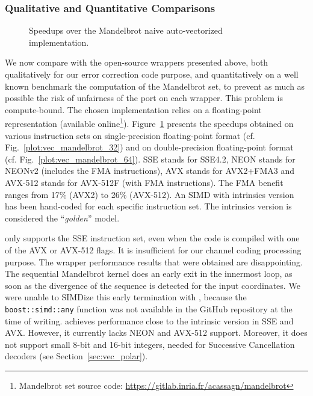 \subsubsection{Qualitative and Quantitative Comparisons}

\begin{figure}[htp]
  \centering
  \quad
  \caption{Speedups over the Mandelbrot naive auto-vectorized implementation.}
  \label{plot:vec_mandelbrot}
\end{figure}

We now compare \MIPP with the open-source wrappers presented above, both
qualitatively for our error correction code purpose, and quantitatively on a
well known benchmark the computation of the Mandelbrot set, to prevent as much
as possible the risk of unfairness of the port on each wrapper. This problem is
compute-bound. The chosen implementation relies on a floating-point
representation (available online\footnote{Mandelbrot set source code:
\url{https://gitlab.inria.fr/acassagn/mandelbrot}}).
Figure~\ref{plot:vec_mandelbrot} presents the speedups obtained on various
instruction sets on single-precision floating-point format (cf.
Fig.~\ref{plot:vec_mandelbrot_32}) and on double-precision floating-point format
(cf. Fig.~\ref{plot:vec_mandelbrot_64}). SSE stands for SSE4.2, NEON stands for
NEONv2 (includes the FMA instructions), AVX stands for AVX2+FMA3 and AVX-512
stands for AVX-512F (with FMA instructions). The FMA benefit ranges from 17\%
(AVX2) to 26\% (AVX-512). An SIMD with intrinsics version has been hand-coded
for each specific instruction set. The intrinsics version is considered the
``\emph{golden}'' model.

\textbf{\BoostSIMD} only supports the SSE instruction set, even when the code is
compiled with one of the AVX or AVX-512 flags. It is insufficient for our
channel coding processing purpose. The \BoostSIMD wrapper performance results
that were obtained are disappointing. The sequential Mandelbrot kernel does an
early exit in the innermost loop, as soon as the divergence of the sequence is
detected for the input coordinates. We were unable to SIMDize this early
termination with \BoostSIMD, because the \verb|boost::simd::any| function was
not available in the GitHub repository at the time of writing. \textbf{\xsimd}
achieves performance close to the intrinsic version in SSE and AVX. However, it
currently lacks NEON and AVX-512 support. Moreover, it does not support small
8-bit and 16-bit integers, needed for Successive Cancellation decoders (see
Section~\ref{sec:vec_polar}).

